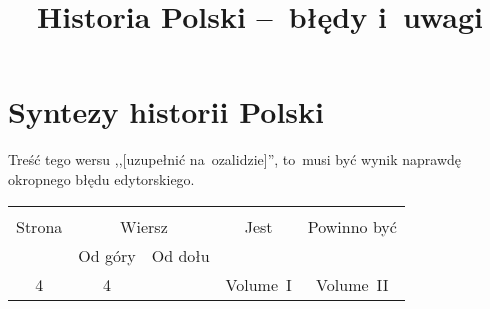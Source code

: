 \documentclass[a4paper,11pt]{article}
\title{Historia Polski --~błędy i~uwagi}
\begin{document}



\maketitle  %



\section{Syntezy historii Polski}

\vspace{\spaceTwo}







\start {} Treść tego wersu ,,[uzupełnić na~ozalidzie]'',
to~musi być wynik naprawdę okropnego błędu edytorskiego.


\begin{center}
  \begin{tabular}{|c|c|c|c|c|}
    \hline
    & \multicolumn{2}{c|}{} & & \\
    Strona & \multicolumn{2}{c|}{Wiersz} & Jest
                              & Powinno być \\ \cline{2-3}
    & Od góry & Od dołu & & \\
    \hline
    4   &  4 & & Volume~I & Volume~II \\
    \hline
  \end{tabular}
\end{center}
\end{document}
